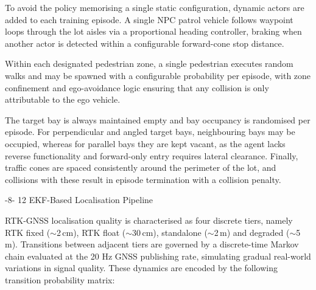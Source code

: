 \documentclass{sig-alternate}
\makeatletter
\renewcommand\subsection{\@startsection{subsection}{2}{\z@}%
    {-8\p@ \@plus -2\p@ \@minus -\p@}%
    {12\p@}%
    {\secfnt}}
\makeatother
\begin{document}
To avoid the policy memorising a single static configuration, dynamic actors are added to each training episode. A single NPC patrol vehicle follows waypoint loops through the lot aisles via a proportional heading controller, braking when another actor is detected within a configurable forward-cone stop distance.

Within each designated pedestrian zone, a single pedestrian executes random walks and may be spawned with a configurable probability per episode, with zone confinement and ego-avoidance logic ensuring that any collision is only attributable to the ego vehicle. 

The target bay is always maintained empty and bay occupancy is randomised per episode. For perpendicular and angled target bays, neighbouring bays may be occupied, whereas for parallel bays they are kept vacant, as the agent lacks reverse functionality and forward-only entry requires lateral clearance. Finally, traffic cones are spaced consistently around the perimeter of the lot, and collisions with these result in episode termination with a collision penalty.

\subsection{EKF-Based Localisation Pipeline}



RTK-GNSS localisation quality is characterised as four discrete tiers, namely RTK fixed ($\sim$2\,cm), RTK float ($\sim$30\,cm), standalone ($\sim$2\,m) and degraded ($\sim$5\,m). Transitions between adjacent tiers are governed by a discrete-time Markov chain evaluated at the 20 Hz GNSS publishing rate, simulating gradual real-world variations in signal quality. These dynamics are encoded by the following transition probability matrix:
\end{document}
